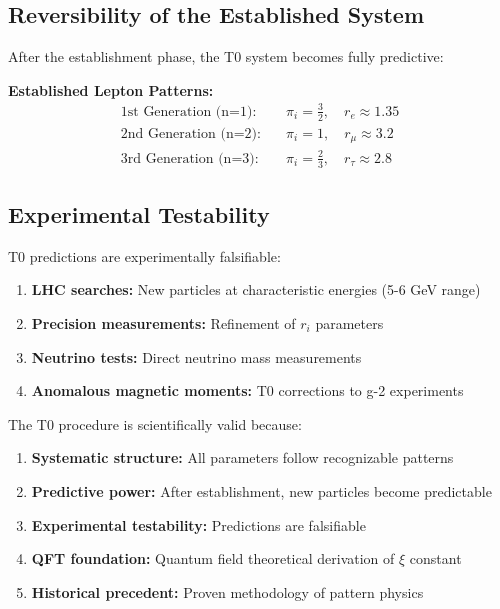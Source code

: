 \documentclass[12pt,a4paper]{article}
\begin{document}
	\subsection{Reversibility of the Established System}
	\label{subsec:reversibility}
	
	After the establishment phase, the T0 system becomes fully predictive:
	
	\textbf{Established Lepton Patterns:}
	\begin{align}
		\text{1st Generation (n=1):} \quad &\pi_i = \frac{3}{2}, \quad r_e \approx 1.35 \\
		\text{2nd Generation (n=2):} \quad &\pi_i = 1, \quad r_\mu \approx 3.2 \\
		\text{3rd Generation (n=3):} \quad &\pi_i = \frac{2}{3}, \quad r_\tau \approx 2.8
	\end{align}
	
	\subsection{Experimental Testability}
	\label{subsec:experimental_testability}
	
	T0 predictions are experimentally falsifiable:
	
	\begin{enumerate}
		\item \textbf{LHC searches:} New particles at characteristic energies (5-6 GeV range)
		\item \textbf{Precision measurements:} Refinement of $r_i$ parameters
		\item \textbf{Neutrino tests:} Direct neutrino mass measurements
		\item \textbf{Anomalous magnetic moments:} T0 corrections to g-2 experiments
	\end{enumerate}
	
	The T0 procedure is scientifically valid because:
	
	\begin{enumerate}
		\item \textbf{Systematic structure:} All parameters follow recognizable patterns
		\item \textbf{Predictive power:} After establishment, new particles become predictable
		\item \textbf{Experimental testability:} Predictions are falsifiable
		\item \textbf{QFT foundation:} Quantum field theoretical derivation of $\xi$ constant
		\item \textbf{Historical precedent:} Proven methodology of pattern physics
	\end{enumerate}
	
\end{document}
